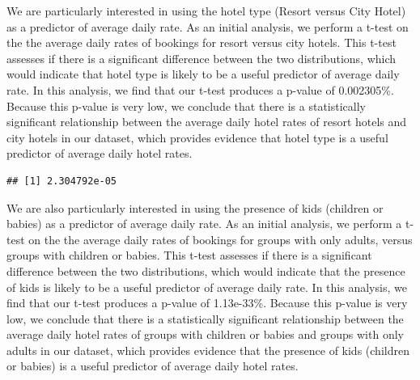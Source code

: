 \documentclass[
]{article}
\newenvironment{Shaded}{\begin{snugshade}}{\end{snugshade}}
\newcommand{\FunctionTok}[1]{\textcolor[rgb]{0.00,0.00,0.00}{#1}}
\newcommand{\NormalTok}[1]{#1}
\newcommand{\OtherTok}[1]{\textcolor[rgb]{0.56,0.35,0.01}{#1}}
\newcommand{\SpecialCharTok}[1]{\textcolor[rgb]{0.00,0.00,0.00}{#1}}
\newcommand{\StringTok}[1]{\textcolor[rgb]{0.31,0.60,0.02}{#1}}
\begin{document}
We are particularly interested in using the hotel type (Resort versus
City Hotel) as a predictor of average daily rate. As an initial
analysis, we perform a t-test on the the average daily rates of bookings
for resort versus city hotels. This t-test assesses if there is a
significant difference between the two distributions, which would
indicate that hotel type is likely to be a useful predictor of average
daily rate. In this analysis, we find that our t-test produces a p-value
of 0.002305\%. Because this p-value is very low, we conclude that there
is a statistically significant relationship between the average daily
hotel rates of resort hotels and city hotels in our dataset, which
provides evidence that hotel type is a useful predictor of average daily
hotel rates.

\begin{Shaded}
\end{Shaded}

\begin{verbatim}
## [1] 2.304792e-05
\end{verbatim}

We are also particularly interested in using the presence of kids
(children or babies) as a predictor of average daily rate. As an initial
analysis, we perform a t-test on the the average daily rates of bookings
for groups with only adults, versus groups with children or babies. This
t-test assesses if there is a significant difference between the two
distributions, which would indicate that the presence of kids is likely
to be a useful predictor of average daily rate. In this analysis, we
find that our t-test produces a p-value of 1.13e-33\%. Because this
p-value is very low, we conclude that there is a statistically
significant relationship between the average daily hotel rates of groups
with children or babies and groups with only adults in our dataset,
which provides evidence that the presence of kids (children or babies)
is a useful predictor of average daily hotel rates.
\end{document}
